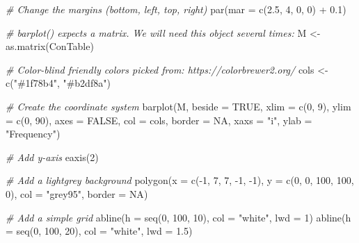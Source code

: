 \documentclass[
]{book}
\newenvironment{Shaded}{\begin{snugshade}}{\end{snugshade}}
\newcommand{\AttributeTok}[1]{\textcolor[rgb]{0.77,0.63,0.00}{#1}}
\newcommand{\CommentTok}[1]{\textcolor[rgb]{0.56,0.35,0.01}{\textit{#1}}}
\newcommand{\ConstantTok}[1]{\textcolor[rgb]{0.00,0.00,0.00}{#1}}
\newcommand{\DecValTok}[1]{\textcolor[rgb]{0.00,0.00,0.81}{#1}}
\newcommand{\FloatTok}[1]{\textcolor[rgb]{0.00,0.00,0.81}{#1}}
\newcommand{\FunctionTok}[1]{\textcolor[rgb]{0.00,0.00,0.00}{#1}}
\newcommand{\NormalTok}[1]{#1}
\newcommand{\OtherTok}[1]{\textcolor[rgb]{0.56,0.35,0.01}{#1}}
\newcommand{\SpecialCharTok}[1]{\textcolor[rgb]{0.00,0.00,0.00}{#1}}
\newcommand{\StringTok}[1]{\textcolor[rgb]{0.31,0.60,0.02}{#1}}
\begin{document}
\begin{Shaded}
\begin{Highlighting}[]
\CommentTok{\# Change the margins (bottom, left, top, right)}
\FunctionTok{par}\NormalTok{(}\AttributeTok{mar =} \FunctionTok{c}\NormalTok{(}\FloatTok{2.5}\NormalTok{, }\DecValTok{4}\NormalTok{, }\DecValTok{0}\NormalTok{, }\DecValTok{0}\NormalTok{) }\SpecialCharTok{+} \FloatTok{0.1}\NormalTok{)}

\CommentTok{\# barplot() expects a matrix. We will need this object several times:}
\NormalTok{M }\OtherTok{\textless{}{-}} \FunctionTok{as.matrix}\NormalTok{(ConTable)}

\CommentTok{\# Color{-}blind friendly colors picked from: https://colorbrewer2.org/}
\NormalTok{cols }\OtherTok{\textless{}{-}} \FunctionTok{c}\NormalTok{(}\StringTok{"\#1f78b4"}\NormalTok{, }\StringTok{"\#b2df8a"}\NormalTok{)}

\CommentTok{\# Create the coordinate system}
\FunctionTok{barplot}\NormalTok{(M, }\AttributeTok{beside =} \ConstantTok{TRUE}\NormalTok{, }\AttributeTok{xlim =} \FunctionTok{c}\NormalTok{(}\DecValTok{0}\NormalTok{, }\DecValTok{9}\NormalTok{), }\AttributeTok{ylim =} \FunctionTok{c}\NormalTok{(}\DecValTok{0}\NormalTok{, }\DecValTok{90}\NormalTok{), }\AttributeTok{axes =} \ConstantTok{FALSE}\NormalTok{, }
        \AttributeTok{col =}\NormalTok{ cols, }\AttributeTok{border =} \ConstantTok{NA}\NormalTok{, }\AttributeTok{xaxs =} \StringTok{"i"}\NormalTok{, }\AttributeTok{ylab =} \StringTok{"Frequency"}\NormalTok{)}

\CommentTok{\# Add y{-}axis}
\FunctionTok{eaxis}\NormalTok{(}\DecValTok{2}\NormalTok{)}

\CommentTok{\# Add a lightgrey background}
\FunctionTok{polygon}\NormalTok{(}\AttributeTok{x =} \FunctionTok{c}\NormalTok{(}\SpecialCharTok{{-}}\DecValTok{1}\NormalTok{, }\DecValTok{7}\NormalTok{, }\DecValTok{7}\NormalTok{, }\SpecialCharTok{{-}}\DecValTok{1}\NormalTok{, }\SpecialCharTok{{-}}\DecValTok{1}\NormalTok{), }\AttributeTok{y =} \FunctionTok{c}\NormalTok{(}\DecValTok{0}\NormalTok{, }\DecValTok{0}\NormalTok{, }\DecValTok{100}\NormalTok{, }\DecValTok{100}\NormalTok{, }\DecValTok{0}\NormalTok{), }
        \AttributeTok{col =} \StringTok{"grey95"}\NormalTok{, }\AttributeTok{border =} \ConstantTok{NA}\NormalTok{)}

\CommentTok{\# Add a simple grid}
\FunctionTok{abline}\NormalTok{(}\AttributeTok{h =} \FunctionTok{seq}\NormalTok{(}\DecValTok{0}\NormalTok{, }\DecValTok{100}\NormalTok{, }\DecValTok{10}\NormalTok{), }\AttributeTok{col =} \StringTok{"white"}\NormalTok{, }\AttributeTok{lwd =} \DecValTok{1}\NormalTok{)}
\FunctionTok{abline}\NormalTok{(}\AttributeTok{h =} \FunctionTok{seq}\NormalTok{(}\DecValTok{0}\NormalTok{, }\DecValTok{100}\NormalTok{, }\DecValTok{20}\NormalTok{), }\AttributeTok{col =} \StringTok{"white"}\NormalTok{, }\AttributeTok{lwd =} \FloatTok{1.5}\NormalTok{)}


\end{Highlighting}
\end{Shaded}
\end{document}
